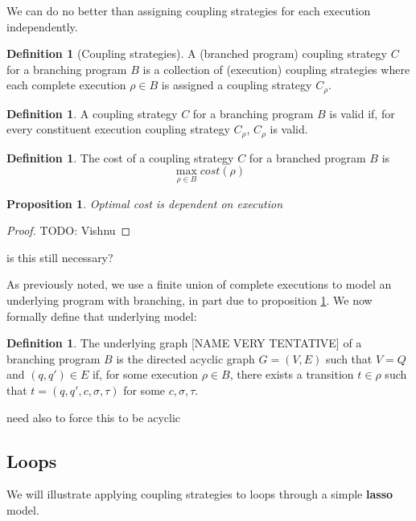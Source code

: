 \documentclass[12pt]{article}
\newtheorem{prop}[thm]{Proposition}
\theoremstyle{definition}
\newtheorem{defn}[thm]{Definition}
\begin{document}
We can do no better than assigning coupling strategies for each execution independently. 
\begin{defn}[Coupling strategies]
    A (branched program) coupling strategy $C$ for a branching program $B$ is a collection of (execution) coupling strategies where each complete execution $\rho\in B$ is assigned a coupling strategy $C_\rho$. 
\end{defn}

\begin{defn}
    A coupling strategy $C$ for a branching program $B$ is valid if, for every constituent execution coupling strategy $C_\rho$, $C_\rho$ is valid. 
\end{defn}

\begin{defn}
    The cost of a coupling strategy $C$ for a branched program $B$ is \[
        \max_{\rho\in B}cost(\rho)
    \]
\end{defn}

\begin{prop}\label{costDependsExecutionProp}
    Optimal cost is dependent on execution
\end{prop}

\begin{proof}
    TODO: Vishnu
\end{proof}

{\color{red} is this still necessary?}

As previously noted, we use a finite union of complete executions to model an underlying program with branching, in part due to proposition \ref{costDependsExecutionProp}. We now formally define that underlying model:

\begin{defn}
    The underlying graph [NAME VERY TENTATIVE] of a branching program $B$ is the directed acyclic graph $G = (V, E)$ such that $V = Q$ and $(q, q')\in E$ if, for some execution $\rho\in B$, there exists a transition $t\in \rho$ such that $t = (q, q', c, \sigma, \tau)$ for some $c, \sigma, \tau$.  

    {\color{red} need also to force this to be acyclic}
\end{defn}


\subsection{Loops}

We will illustrate applying coupling strategies to loops through a simple \textbf{lasso} model. 
\end{document}
